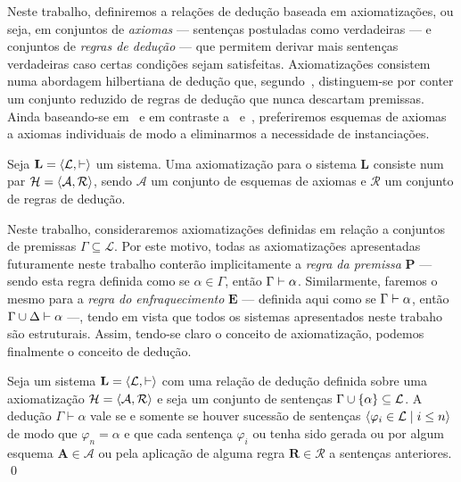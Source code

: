 Neste trabalho, definiremos a relações de dedução baseada em axiomatizações, ou seja, em conjuntos de \emph{axiomas} --- sentenças postuladas como verdadeiras --- e conjuntos de \emph{regras de dedução} --- que permitem derivar mais sentenças verdadeiras caso certas condições sejam satisfeitas. Axiomatizações consistem numa abordagem hilbertiana de dedução que, segundo~\cite{Troelstra}, distinguem-se por conter um conjunto reduzido de regras de dedução que nunca descartam premissas. Ainda baseando-se em~\cite{Troelstra} e em contraste a~\cite{Frege} e~\cite{Hilbert-A, Hilbert-B}, preferiremos esquemas de axiomas a axiomas individuais de modo a eliminarmos a necessidade de instanciações.

\begin{definition}[Axiomatização]
    Seja $\mathbf{L}=\langle\mathcal{L},\vdash\rangle$ um sistema. Uma axiomatização para o sistema $\mathbf{L}$ consiste num par $\mathcal{H}=\langle\mathcal{A},\mathcal{R}\rangle$, sendo $\mathcal{A}$ um conjunto de esquemas de axiomas e $\mathcal{R}$ um conjunto de regras de dedução.
\end{definition}


Neste trabalho, consideraremos axiomatizações definidas em relação a conjuntos de premissas $\Gamma\subseteq\mathcal{L}$. 
Por este motivo, todas as axiomatizações apresentadas futuramente neste trabalho conterão implicitamente a \emph{regra da premissa} $\mathbf{P}$ --- sendo esta regra definida como se $\alpha\in\Gamma$, então $\Gamma\mathrel{\vdash}\alpha$.
Similarmente, faremos o mesmo para a \emph{regra do enfraquecimento} $\mathbf{E}$ --- definida aqui como se $\Gamma\mathrel{\vdash}\alpha$, então $\Gamma\cup\Delta\mathrel{\vdash}\alpha$ ---, tendo em vista que todos os sistemas apresentados neste trabaho são estruturais. Assim, tendo-se claro o conceito de axiomatização, podemos finalmente o conceito de dedução.

\begin{definition}[Dedução]
    Seja um sistema $\mathbf{L} = \langle\mathcal{L},{\vdash}\rangle$ com uma relação de dedução definida sobre uma axiomatização $\mathcal{H} = \langle\mathcal{A},\mathcal{R}\rangle$ e  seja um conjunto de sentenças $\Gamma\cup\left\{\alpha\right\}\subseteq\mathcal{L}$.
    A dedução $\Gamma\vdash\alpha$ vale se e somente se houver sucessão de sentenças $\langle\varphi_i\in\mathcal{L}\mid i\leq n\rangle$ de modo que $\varphi_n=\alpha$ e que cada sentença $\varphi_i$ ou tenha sido gerada ou por algum esquema $\mathbf{A}\in\mathcal{A}$ ou pela aplicação de alguma regra $\mathbf{R}\in\mathcal{R}$ a sentenças anteriores.
    \qed{}
\end{definition}

